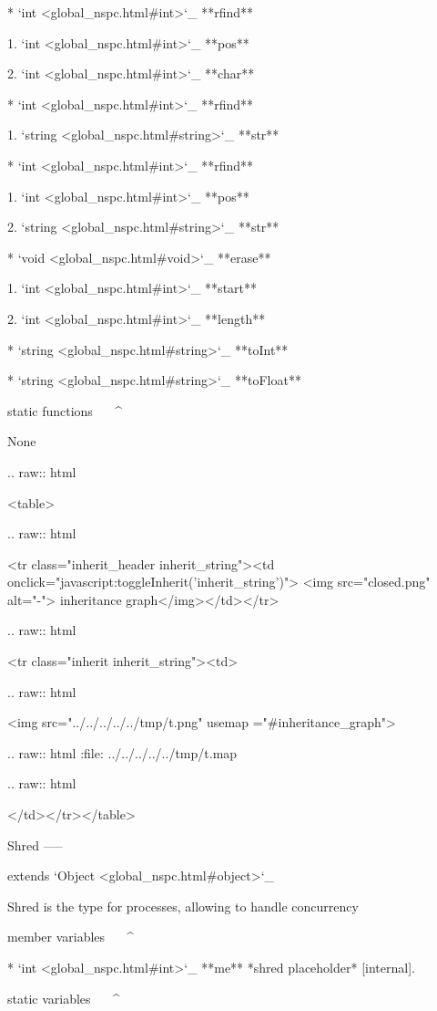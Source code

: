 	* `int <global_nspc.html#int>`_ **rfind**

		1. `int <global_nspc.html#int>`_ **pos**

		2. `int <global_nspc.html#int>`_ **char**

	* `int <global_nspc.html#int>`_ **rfind**

		1. `string <global_nspc.html#string>`_ **str**

	* `int <global_nspc.html#int>`_ **rfind**

		1. `int <global_nspc.html#int>`_ **pos**

		2. `string <global_nspc.html#string>`_ **str**

	* `void <global_nspc.html#void>`_ **erase**

		1. `int <global_nspc.html#int>`_ **start**

		2. `int <global_nspc.html#int>`_ **length**

	* `string <global_nspc.html#string>`_ **toInt**

	* `string <global_nspc.html#string>`_ **toFloat**

static functions
^^^^^^^^^^^^^^^^


	None


  .. raw:: html

   <table>


  .. raw:: html

   <tr class="inherit_header inherit_string"><td onclick="javascript:toggleInherit('inherit_string')"> <img src="closed.png" alt="-"> inheritance graph</img></td></tr>


  .. raw:: html

   <tr class="inherit inherit_string"><td>


  .. raw:: html

   <img src="../../../../../tmp/t.png" usemap ="#inheritance_graph">


  .. raw:: html
   :file:   ../../../../../tmp/t.map


  .. raw:: html

   </td></tr></table>

Shred
-----

extends `Object <global_nspc.html#object>`_ 

Shred is the type for processes, allowing to handle concurrency

member variables
^^^^^^^^^^^^^^^^

	* `int <global_nspc.html#int>`_ **me** *shred placeholder*  [internal].


static variables
^^^^^^^^^^^^^^^^

